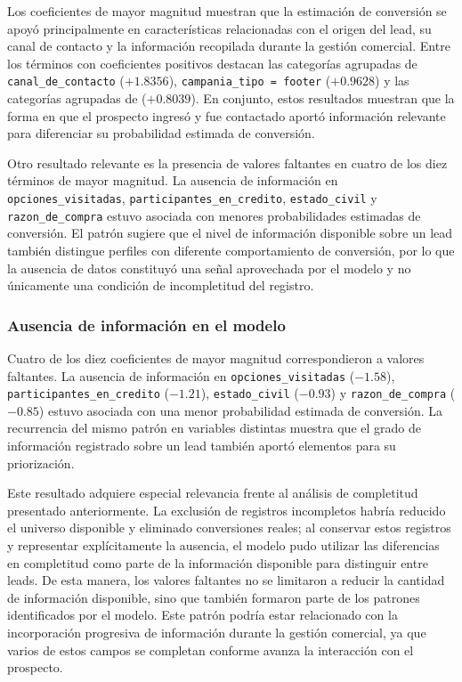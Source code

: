 Los coeficientes de mayor magnitud muestran que la estimación de conversión se apoyó principalmente en características relacionadas con el origen del lead, su canal de contacto y la información recopilada durante la gestión comercial. Entre los términos con coeficientes positivos destacan las categorías agrupadas de \texttt{canal\_de\_contacto} ($+1.8356$), \texttt{campania\_tipo = footer} ($+0.9628$) y las categorías agrupadas de  ($+0.8039$). En conjunto, estos resultados muestran que la forma en que el prospecto ingresó y fue contactado aportó información relevante para diferenciar su probabilidad estimada de conversión.

Otro resultado relevante es la presencia de valores faltantes en cuatro de los diez términos de mayor magnitud. La ausencia de información en \texttt{opciones\_visitadas}, \texttt{participantes\_en\_credito}, \texttt{estado\_civil} y \texttt{razon\_de\_compra} estuvo asociada con menores probabilidades estimadas de conversión. El patrón sugiere que el nivel de información disponible sobre un lead también distingue perfiles con diferente comportamiento de conversión, por lo que la ausencia de datos constituyó una señal aprovechada por el modelo y no únicamente una condición de incompletitud del registro.

\subsubsection{Ausencia de información en el modelo}
\label{sec:disc-ausencia-senal}

Cuatro de los diez coeficientes de mayor magnitud correspondieron a valores faltantes. La ausencia de información en \texttt{opciones\_visitadas} ($-1.58$), \texttt{participantes\_en\_credito} ($-1.21$), \texttt{estado\_civil} ($-0.93$) y \texttt{razon\_de\_compra} ($-0.85$) estuvo asociada con una menor probabilidad estimada de conversión. La recurrencia del mismo patrón en variables distintas muestra que el grado de información registrado sobre un lead también aportó elementos para su priorización.

Este resultado adquiere especial relevancia frente al análisis de completitud presentado anteriormente. La exclusión de registros incompletos habría reducido el universo disponible y eliminado conversiones reales; al conservar estos registros y representar explícitamente la ausencia, el modelo pudo utilizar las diferencias en completitud como parte de la información disponible para distinguir entre leads. De esta manera, los valores faltantes no se limitaron a reducir la cantidad de información disponible, sino que también formaron parte de los patrones identificados por el modelo. Este patrón podría estar relacionado con la incorporación progresiva de información durante la gestión comercial, ya que varios de estos campos se completan conforme avanza la interacción con el prospecto.

